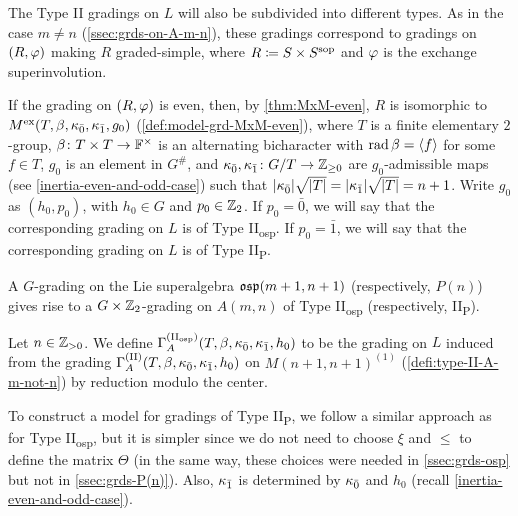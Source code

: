 The Type II gradings on $L$ will also be subdivided into different types. 
As in the case $m\neq n$ (\cref{ssec:grds-on-A-m-n}), these gradings correspond to gradings on $(R, \varphi)$ making $R$ graded-simple, where $R \coloneqq S \times S^{\mathrm{sop}}$ and $\varphi$ is the exchange superinvolution. 

If the grading on $(R,\varphi)$ is even, then, by \cref{thm:MxM-even}, $R$ is isomorphic to $M^{\mathrm{ex}} (T, \beta, \kappa_{\bar{0}}, \kappa_{\bar{1}}, g_0)$ (\cref{def:model-grd-MxM-even}), where $T$ is a finite elementary $2$-group, $\beta\colon {T\times T} \to \mathbb{F}^\times$ is an alternating bicharacter with $\operatorname{rad} \beta = \langle f \rangle$ for some $f \in T$, $g_0$ is an element in $G^\#$, and $\kappa_{\bar{0}}, \kappa_{\bar{1}} \colon G/T \to \mathbb{Z}_{\geq 0}$ are $g_0$-admissible maps (see \cref{inertia-even-and-odd-case}) such that $|\kappa_{\bar{0}}| \sqrt{|T|} = |\kappa_{\bar{1}}| \sqrt{|T|} = n+1$. 
Write $g_0$ as $(h_0, p_0)$, with $h_0 \in G$ and $p_0 \in \mathbb{Z}_2$. 
If $p_0 = \bar 0$, we will say that the corresponding grading on $L$ is of Type II\textsubscript{osp}. 
If $p_0 = \bar 1$, we will say that the corresponding grading on $L$ is of Type II\textsubscript{P}. 

\begin{remark}
    A $G$-grading on the Lie superalgebra $\mathfrak{osp}(m+1,n+1)$ (respectively, $P(n)$) gives rise to a $G \times \mathbb{Z}_2$-grading on $A(m,n)$ of Type II\textsubscript{osp} (respectively, II\textsubscript{P}). 
\end{remark}

\begin{defi}\label{def:type-II-osp}
    Let $n\in \mathbb{Z}_{> 0}$. 
    We define $\Gamma^{\mathrm{(II_{osp})}}_A(T, \beta, \kappa_{\bar{0}}, \kappa_{\bar{1}}, h_0)$ to be the grading on $L$ induced from the grading $\Gamma^{\mathrm{(II)}}_A(T, \beta, \kappa_{\bar{0}}, \kappa_{\bar{1}}, h_0)$ on $M(n+1, n+1)^{(1)}$ (\cref{defi:type-II-A-m-not-n}) by reduction modulo the center.
\end{defi}

To construct a model for gradings of Type II\textsubscript{P}, we follow a similar approach as for Type II\textsubscript{osp}, but it is simpler since we do not need to choose $\xi$ and $\leq$ to define the matrix $\Theta$ (in the same way, these choices were needed in \cref{ssec:grds-osp} but not in \cref{ssec:grds-P(n)}). 
Also, $\kappa_{\bar{1}}$ is determined by $\kappa_{\bar{0}}$ and $h_0$ (recall \cref{inertia-even-and-odd-case}).

